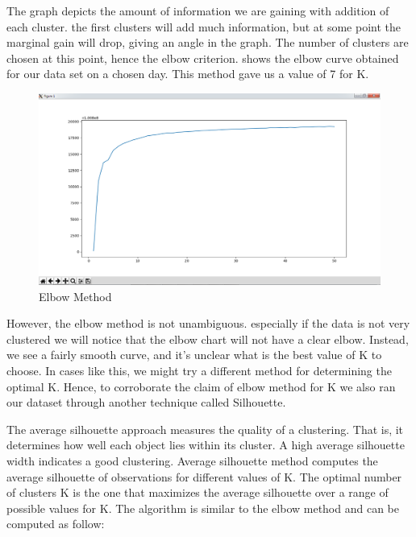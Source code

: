  	The graph depicts the amount of information we are gaining with addition of each cluster. the first clusters will add much information, but at some point the marginal gain will drop, giving an angle in the graph. The number of clusters are chosen at this point, hence the elbow criterion.  shows the elbow curve obtained for our data set on a chosen day. This method gave us a value of 7 for K.
 	

\begin{figure}[b]
	\centerline{\includegraphics[scale = 0.4]{elbow.png}}
	\caption{Elbow Method}%
\end{figure}

 However, the elbow method is not unambiguous. especially if the data is not very clustered we will notice that the elbow chart will not have a clear elbow. Instead, we see a fairly smooth curve, and it's unclear what is the best value of K to choose. In cases like this, we might try a different method for determining the optimal K. Hence, to corroborate the claim of elbow method for K we also ran our dataset through another technique called Silhouette.

	The average silhouette approach measures the quality of a clustering. That is, it determines how well each object lies within its cluster. A high average silhouette width indicates a good clustering.	Average silhouette method computes the average silhouette of observations for different values of K. The optimal number of clusters K is the one that maximizes the average silhouette over a range of possible values for K.	The algorithm is similar to the elbow method and can be computed as follow: 
	
